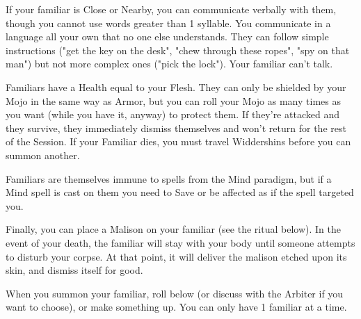 {If your familiar is Close or Nearby, you can communicate verbally with them, though you cannot use words greater than 1 syllable.  You communicate in a language all your own that no one else understands.  They can follow simple instructions ("get the key on the desk", "chew through these ropes", "spy on that man") but not more complex ones ("pick the lock").  Your familiar can't talk.

Familiars have a Health equal to your Flesh.  They can only be shielded by your Mojo in the same way as Armor, but you can roll your Mojo as many times as you want (while you have it, anyway) to protect them.  If they're attacked and they survive, they immediately dismiss themselves and won't return for the rest of the Session. If your Familiar dies, you must travel Widdershins before you can summon another.  

Familiars are themselves immune to spells from the Mind paradigm, but if a Mind spell is cast on them you need to Save or be affected as if the spell targeted you.

Finally,  you can place a Malison on your familiar (see the ritual below).  In the event of your death, the familiar will stay with your body until someone attempts to disturb your corpse.  At that point, it will deliver the malison etched upon its skin, and dismiss itself for good.

When you summon your familiar, roll below (or discuss with the Arbiter if you want to choose), or make something up.  You can only have 1 familiar at a time.






}
